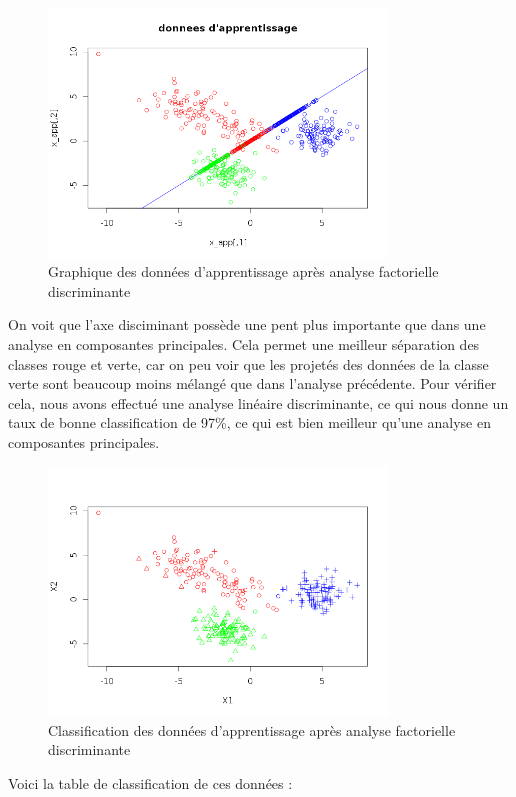 \documentclass[a4paper,11pt]{article}
\begin{document}
  \begin{figure}[H]
  \center
   \includegraphics[width=9cm]{app_fact.png}
   \caption{Graphique des données d'apprentissage après analyse factorielle discriminante}
  \end{figure}
  
  On voit que l'axe disciminant possède une pent plus importante que dans une analyse en 
  composantes principales. Cela permet une meilleur séparation des classes rouge et verte, car
  on peu voir que les projetés des données de la classe verte sont beaucoup moins mélangé 
  que dans l'analyse précédente. Pour vérifier cela, nous avons effectué une analyse linéaire
  discriminante, ce qui nous donne un taux de bonne classification de 97\%, ce qui est bien
  meilleur qu'une analyse en composantes principales. 
  
  \begin{figure}[H]
    \center
   \includegraphics[width=9cm]{app_fact_class.png}
    \caption{Classification des données d'apprentissage après analyse factorielle discriminante}
  \end{figure}

  Voici la table de classification de ces 
  données : \\
  
\end{document}
